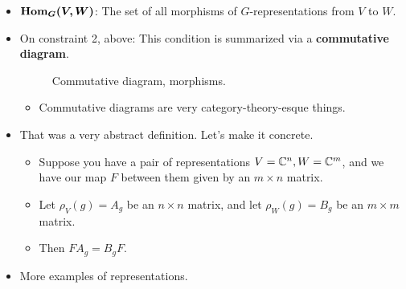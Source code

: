 \documentclass[../notes.tex]{subfiles}
\begin{document}
\begin{itemize}
\begin{enumerate}
        \item $f$ is linear;
        \item $f$ respects the structure of the representations; explicitly, for every $g\in G$, $\rho_W(g)\circ f=f\circ\rho_V(g)$\footnote{Recall that the object, $\rho_V(g)$ is a linear map! Thus, it can be composed with other linear maps like $f$.}.
    \end{enumerate}
    \item $\bm{\Hom_G(V,W)}$: The set of all morphisms of $G$-representations from $V$ to $W$.
    \item On constraint 2, above: This condition is summarized via a \textbf{commutative diagram}.
    \begin{figure}[h!]
        \centering
        \DisableQuotes
        \EnableQuotes
        \vspace{-1.5em}
        \caption{Commutative diagram, morphisms.}
        \label{fig:CDmorphisms}
    \end{figure}
    \begin{itemize}
        \item Commutative diagrams are very category-theory-esque things.
    \end{itemize}
    \item That was a very abstract definition. Let's make it concrete.
    \begin{itemize}
        \item Suppose you have a pair of representations $V=\mathbb{C}^n,W=\mathbb{C}^m$, and we have our map $F$ between them given by an $m\times n$ matrix.
        \item Let $\rho_V(g)=A_g$ be an $n\times n$ matrix, and let $\rho_W(g)=B_g$ be an $m\times m$ matrix.
        \item Then $FA_g=B_gF$.
    \end{itemize}
    \item More examples of representations.
    \begin{enumerate}

\end{enumerate}
\end{itemize}
\end{document}
